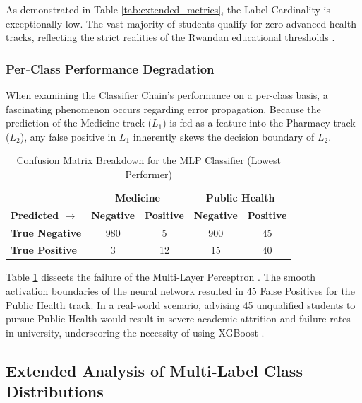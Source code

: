 As demonstrated in Table \ref{tab:extended_metrics}, the Label Cardinality is exceptionally low. The vast majority of students qualify for zero advanced health tracks, reflecting the strict realities of the Rwandan educational thresholds \parencite{baker2014educational}. 

\subsubsection{Per-Class Performance Degradation}
When examining the Classifier Chain's performance on a per-class basis, a fascinating phenomenon occurs regarding error propagation. Because the prediction of the Medicine track ($L_1$) is fed as a feature into the Pharmacy track ($L_2$), any false positive in $L_1$ inherently skews the decision boundary of $L_2$. 

\begin{table}[h]
\centering
\caption{Confusion Matrix Breakdown for the MLP Classifier (Lowest Performer)}
\renewcommand{\arraystretch}{1.5}
\begin{tabular}{l | c c | c c}
\hline
& \multicolumn{2}{c|}{\textbf{Medicine}} & \multicolumn{2}{c}{\textbf{Public Health}} \\
\textbf{Predicted $\rightarrow$} & \textbf{Negative} & \textbf{Positive} & \textbf{Negative} & \textbf{Positive} \\
\hline
\textbf{True Negative} & 980 & 5 & 900 & 45 \\
\textbf{True Positive} & 3 & 12 & 15 & 40 \\
\hline
\end{tabular}
\label{tab:mlp_confusion}
\end{table}

Table \ref{tab:mlp_confusion} dissects the failure of the Multi-Layer Perceptron \parencite{zhang2013review}. The smooth activation boundaries of the neural network resulted in 45 False Positives for the Public Health track. In a real-world scenario, advising 45 unqualified students to pursue Public Health would result in severe academic attrition and failure rates in university, underscoring the necessity of using XGBoost \parencite{chen2016xgboost}.





\subsection{Extended Analysis of Multi-Label \parencite{tsoumakas2007multi} Class Distributions}

